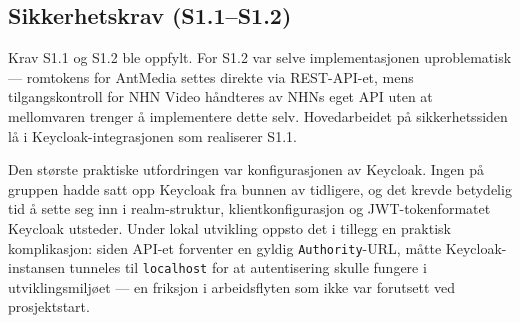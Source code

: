\subsection{Sikkerhetskrav (S1.1--S1.2)}
\label{sec:eval-sikkerhet}


Krav S1.1 og S1.2 ble oppfylt. For S1.2 var selve implementasjonen uproblematisk — romtokens for AntMedia settes direkte via REST-API-et, mens tilgangskontroll for NHN Video håndteres av NHNs eget API uten at mellomvaren trenger å implementere dette selv. Hovedarbeidet på sikkerhetssiden lå i Keycloak-integrasjonen som realiserer S1.1.


Den største praktiske utfordringen var konfigurasjonen av Keycloak. Ingen på gruppen hadde satt opp Keycloak fra bunnen av tidligere, og det krevde betydelig tid å sette seg inn i realm-struktur, klientkonfigurasjon og JWT-tokenformatet Keycloak utsteder. Under lokal utvikling oppsto det i tillegg en praktisk komplikasjon: siden API-et forventer en gyldig \texttt{Authority}-URL, måtte Keycloak-instansen tunneles til \texttt{localhost} for at autentisering skulle fungere i utviklingsmiljøet — en friksjon i arbeidsflyten som ikke var forutsett ved prosjektstart.


